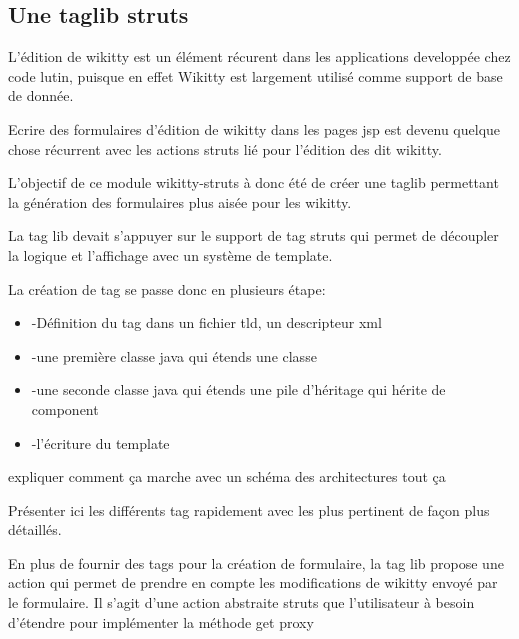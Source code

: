 \subsection{Une taglib struts}

L'édition de wikitty est un élément récurent dans les applications developpée 
chez code lutin, puisque en effet Wikitty est largement utilisé comme support
de base de donnée.

Ecrire des formulaires d'édition de wikitty dans les pages jsp est devenu
quelque chose récurrent avec les actions struts lié pour l'édition des dit wikitty.

L'objectif de ce module wikitty-struts à donc été de créer une taglib permettant
la génération des formulaires plus aisée pour les wikitty. 

La tag lib devait s'appuyer sur le support de tag struts qui permet de découpler
la logique et l'affichage avec un système de template. 

La création de tag se passe donc en plusieurs étape:
\begin{itemize}
\item -Définition du tag dans un fichier tld, un descripteur xml
\item -une première classe java qui étends une classe
\item -une seconde classe java qui étends une pile d'héritage qui hérite de component
\item -l'écriture du template
\end{itemize}

expliquer comment ça marche avec un schéma des architectures tout ça

Présenter ici les différents tag rapidement avec les plus pertinent de façon plus 
détaillés.


En plus de fournir des tags pour la création de formulaire, la tag lib propose 
une action qui permet de prendre en compte les modifications de wikitty envoyé
par le formulaire. Il s'agit d'une action abstraite struts que l'utilisateur à 
besoin d'étendre pour implémenter la méthode get proxy


